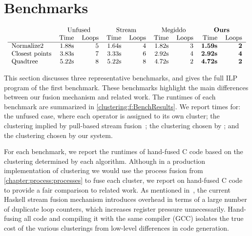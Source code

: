 \section{Benchmarks}
\label{clustering:s:Benchmarks}

\begin{table}
$$\begin{array}{c}

\begin{tabular}{lrrrrrrrr}
                & \multicolumn{2}{c}{Unfused}         & \multicolumn{2}{c}{Stream}
                & \multicolumn{2}{c}{Megiddo} &\multicolumn{2}{c}{\textbf{Ours}} \\
                & Time & Loops   & Time & Loops      & Time & Loops & Time & Loops   \\
\hline
Normalize2      & 1.88s & 5      & 1.64s & 4          & 1.82s & 3  & \textbf{1.59s} & \textbf{2}\\
Closest points  & 3.83s & 7      & 3.33s & 6          & 2.92s & 4  & \textbf{2.92s} & \textbf{4}\\
Quadtree        & 5.22s & 8      & 5.22s & 8          & 4.72s & 2  & \textbf{4.72s} & \textbf{2}\\
\end{tabular}

\end{array}$$
\caption{Benchmark results}
\label{clustering:f:BenchResults}
\end{table}

This section discusses three representative benchmarks, and gives the full ILP program of the first benchmark.
These benchmarks highlight the main differences between our fusion mechanism and related work.
The runtimes of each benchmark are summarized in \cref{clustering:f:BenchResults}.
We report times for: the unfused case, where each operator is assigned to its own cluster; the clustering implied by pull-based stream fusion~\cite{coutts2007stream}; the clustering chosen by \cite{megiddo1998optimal}; and the clustering chosen by our system. 

For each benchmark, we report the runtimes of hand-fused C code based on the clustering determined by each algorithm.
Although in a production implementation of clustering we would use the process fusion from \cref{chapter:process:processes} to fuse each cluster, we report on hand-fused C code to provide a fair comparison to related work.
As mentioned in~\citet{lippmeier2013data}, the current Haskell stream fusion mechanism introduces overhead in terms of a large number of duplicate loop counters, which increases register pressure unnecessarily.
Hand-fusing all code and compiling it with the same compiler (GCC) isolates the true cost of the various clusterings from low-level differences in code generation.


